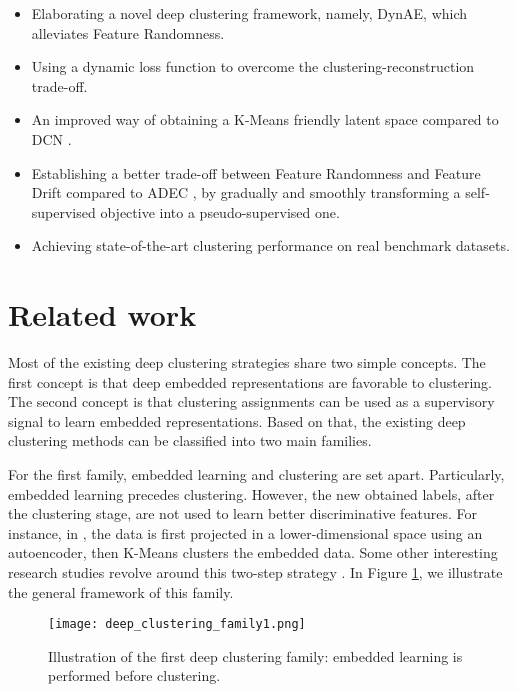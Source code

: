 \documentclass{article}
\begin{document}
\begin{itemize}
  \item Elaborating a novel deep clustering framework, namely, DynAE, which alleviates Feature Randomness.
  \item Using a dynamic loss function to overcome the clustering-reconstruction trade-off.
  \item An improved way of obtaining a K-Means friendly latent space compared to DCN \cite{paper29}.
  \item Establishing a better trade-off between Feature Randomness and Feature Drift compared to ADEC \cite{paper98}, by gradually and smoothly transforming a self-supervised objective into a pseudo-supervised one.
  \item Achieving state-of-the-art clustering performance on real benchmark datasets.
\end{itemize}


\section{Related work}
Most of the existing deep clustering strategies share two simple concepts. The first concept is that deep embedded representations are favorable to clustering. The second concept is that clustering assignments can be used as a supervisory signal to learn embedded representations. Based on that, the existing deep clustering methods can be classified into two main families. 

For the first family, embedded learning and clustering are set apart. Particularly, embedded learning precedes clustering. However, the new obtained labels, after the clustering stage, are not used to learn better discriminative features. For instance, in \cite{paper88}, the data is first projected in a lower-dimensional space using an autoencoder, then K-Means clusters the embedded data. Some other interesting research studies revolve around this two-step strategy \cite{paper89, paper90}. In Figure \ref{fig:deep_clustering_family1}, we illustrate the general framework of this family. 

\begin{figure}[ht]
\vskip 0.2in
\begin{center}
\centerline{\texttt{[image: deep\_clustering\_family1.png]}}
\caption{Illustration of the first deep clustering family: embedded learning is performed before clustering.}
\label{fig:deep_clustering_family1}
\end{center}
\vskip -0.2in
\end{figure}
\end{document}
